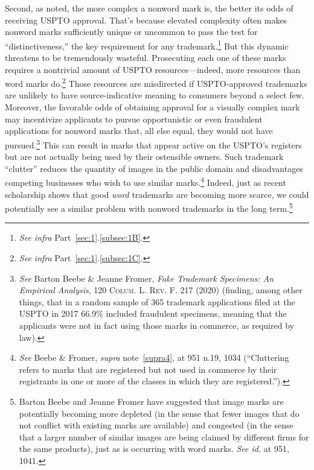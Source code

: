 \documentclass[letterpaper, 11pt, oneside]{article}
\begin{document}
Second, as noted, the more complex a nonword mark is, the better its odds of receiving USPTO approval. That's because elevated complexity often makes nonword marks sufficiently unique or uncommon to pass the test for ``distinctiveness,'' the key requirement for any trademark.\footnote{\textit{See infra} Part~\ref{sec:1}.\ref{subsec:1B}.} But this dynamic threatens to be tremendously wasteful. Prosecuting each one of these marks requires a nontrivial amount of USPTO resources—indeed, more resources than word marks do.\footnote{\textit{See infra} Part~\ref{sec:1}.\ref{subsec:1C}.} Those resources are misdirected if USPTO-approved trademarks are unlikely to have source-indicative meaning to consumers beyond a select few. Moreover, the favorable odds of obtaining approval for a visually complex mark may incentivize applicants to pursue opportunistic or even fraudulent applications for nonword marks that, all else equal, they would not have pursued.\footnote{\textit{See} Barton Beebe \& Jeanne Fromer, \textit{Fake Trademark Specimens: An Empirical Analysis}, 120 \textsc{Colum. L. Rev. F.} 217 (2020) (finding, among other things, that in a random sample of 365 trademark applications filed at the USPTO in 2017 66.9\% included fraudulent specimens, meaning that the applicants were not in fact using those marks in commerce, as required by law).} This can result in marks that appear active on the USPTO's registers but are not actually being used by their ostensible owners. Such trademark ``clutter'' reduces the quantity of images in the public domain and disadvantages competing businesses who wish to use similar marks.\footnote{\textit{See} Beebe \& Fromer, \textit{supra} note~\ref{supra4}, at 951 n.19, 1034 (``Cluttering refers to marks that are registered but not used in commerce by their registrants in one or more of the classes in which they are registered.'').} Indeed, just as recent scholarship shows that good \textit{word} trademarks are becoming more scarce, we could potentially see a similar problem with nonword trademarks in the long term.\footnote{Barton Beebe and Jeanne Fromer have suggested that image marks are potentially becoming more depleted (in the sense that fewer images that do not conflict with existing marks are available) and congested (in the sense that a larger number of similar images are being claimed by different firms for the same products), just as is occurring with word marks. \textit{See id.} at 951, 1041.}
\end{document}
